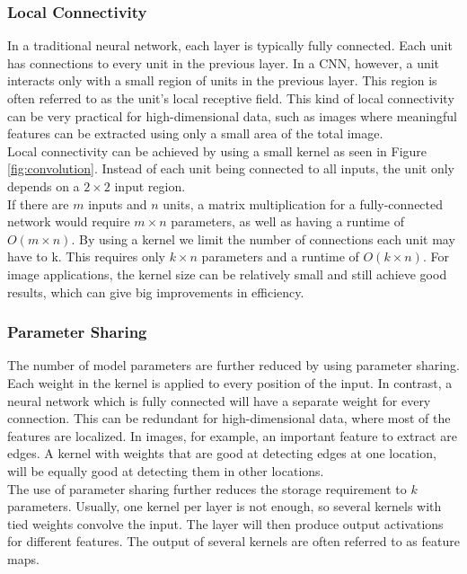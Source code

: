 \subsubsection{Local Connectivity}
In a traditional neural network, each layer is typically fully connected. Each unit has connections to every unit in the previous layer. In a \ac{CNN}, however, a unit interacts only with a small region of units in the previous layer. This region is often referred to as the unit's local receptive field. This kind of local connectivity can be very practical for high-dimensional data, such as images where meaningful features can be extracted using only a small area of the total image. \\

Local connectivity can be achieved by using a small kernel as seen in Figure \ref{fig:convolution}. Instead of each unit being connected to all inputs, the unit only depends on a $2 \times 2$ input region. \\

If there are $m$ inputs and $n$ units, a matrix multiplication for a fully-connected network would require $m\times n$ parameters, as well as having a runtime of $O(m\times n)$. By using a kernel we limit the number of connections each unit may have to k. This requires only $k\times n$ parameters and a runtime of $O(k\times n)$. For image applications, the kernel size can be relatively small and still achieve good results, which can give big improvements in efficiency.

\subsubsection{Parameter Sharing}
The number of model parameters are  further reduced by using parameter sharing. Each weight in the kernel is applied to every position of the input. In contrast, a neural network which is fully connected will have a separate weight for every connection. This can be redundant for high-dimensional data, where most of the features are localized. In images, for example, an important feature to extract are edges. A kernel with weights that are good at detecting edges at one location, will be equally good at detecting them in other locations. \\

The use of parameter sharing further reduces the storage requirement to $k$ parameters. Usually, one kernel per layer is not enough, so several kernels with tied weights convolve the input. The layer will then produce output activations for different features. The output of several kernels are  often referred to as feature maps.


